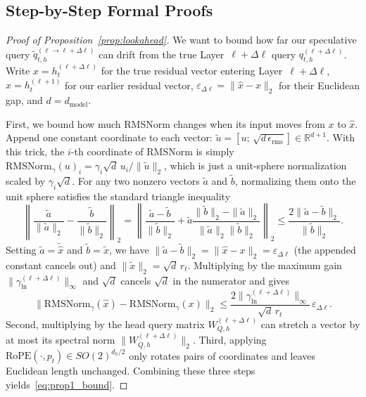 \documentclass[pdflatex,sn-mathphys-num]{sn-jnl}
\theoremstyle{thmstyleone}
\newcommand{\RoPE}{\mathrm{RoPE}}
\begin{document}
\begin{appendices}

\section{Step-by-Step Formal Proofs}\label{app:proofs}

\begin{proof}[Proof of Proposition~\ref{prop:lookahead}]
We want to bound how far our speculative query $\tilde{q}_{t,h}^{(\ell\to\ell+\Delta\ell)}$ can drift from the true Layer~$\ell+\Delta\ell$ query $q_{t,h}^{(\ell+\Delta\ell)}$. Write $x = h_t^{(\ell+\Delta\ell)}$ for the true residual vector entering Layer~$\ell+\Delta\ell$, $\hat{x} = h_t^{(\ell+1)}$ for our earlier residual vector, $\varepsilon_{\Delta\ell} = \|\hat{x} - x\|_2$ for their Euclidean gap, and $d = d_{\mathrm{model}}$.

First, we bound how much RMSNorm changes when its input moves from $x$ to $\hat{x}$. Append one constant coordinate to each vector: $\tilde{u} = [u;\, \sqrt{d\,\epsilon_{\mathrm{rms}}}] \in \mathbb{R}^{d+1}$. With this trick, the $i$-th coordinate of RMSNorm is simply $\mathrm{RMSNorm}_\gamma(u)_i = \gamma_i \sqrt{d}\, u_i / \|\tilde{u}\|_2$, which is just a unit-sphere normalization scaled by $\gamma_i \sqrt{d}$. For any two nonzero vectors $\tilde{a}$ and $\tilde{b}$, normalizing them onto the unit sphere satisfies the standard triangle inequality
\[
\left\|\frac{\tilde{a}}{\|\tilde{a}\|_2} - \frac{\tilde{b}}{\|\tilde{b}\|_2}\right\|_2
= \left\|\frac{\tilde{a} - \tilde{b}}{\|\tilde{b}\|_2} + \tilde{a}\frac{\|\tilde{b}\|_2 - \|\tilde{a}\|_2}{\|\tilde{a}\|_2 \|\tilde{b}\|_2}\right\|_2
\le \frac{2\|\tilde{a} - \tilde{b}\|_2}{\|\tilde{b}\|_2}.
\]
Setting $\tilde{a} = \tilde{\hat{x}}$ and $\tilde{b} = \tilde{x}$, we have $\|\tilde{a} - \tilde{b}\|_2 = \|\hat{x} - x\|_2 = \varepsilon_{\Delta\ell}$ (the appended constant cancels out) and $\|\tilde{x}\|_2 = \sqrt{d}\, r_t$. Multiplying by the maximum gain $\|\gamma_{\mathrm{ln}}^{(\ell+\Delta\ell)}\|_\infty$ and $\sqrt{d}$ cancels $\sqrt{d}$ in the numerator and gives
\[
\|\mathrm{RMSNorm}_\gamma(\hat{x}) - \mathrm{RMSNorm}_\gamma(x)\|_2
\le \frac{2 \|\gamma_{\mathrm{ln}}^{(\ell+\Delta\ell)}\|_\infty}{\sqrt{d}\, r_t}\,\varepsilon_{\Delta\ell}.
\]
Second, multiplying by the head query matrix $W_{Q,h}^{(\ell+\Delta\ell)}$ can stretch a vector by at most its spectral norm $\|W_{Q,h}^{(\ell+\Delta\ell)}\|_2$. Third, applying $\RoPE(\cdot, p_t) \in SO(2)^{d_h/2}$ only rotates pairs of coordinates and leaves Euclidean length unchanged. Combining these three steps yields~\eqref{eq:prop1_bound}.


\end{proof}
\end{appendices}
\end{document}
